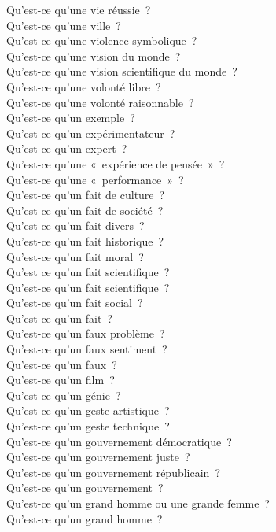 \documentclass[a4paper,12pt]{article}
\begin{document}
Qu'est-ce qu'une vie réussie ? \\
Qu'est-ce qu'une ville ? \\
Qu'est-ce qu'une violence symbolique ? \\
Qu'est-ce qu'une vision du monde ? \\
Qu'est-ce qu'une vision scientifique du monde ? \\
Qu'est-ce qu'une volonté libre ? \\
Qu'est-ce qu'une volonté raisonnable ? \\
Qu'est-ce qu'un exemple ? \\
Qu'est-ce qu'un expérimentateur ? \\
Qu'est-ce qu'un expert ? \\
Qu'est-ce qu'une « expérience de pensée » ? \\
Qu'est-ce qu'une « performance » ? \\
Qu'est-ce qu'un fait de culture ? \\
Qu'est-ce qu'un fait de société ? \\
Qu'est-ce qu'un fait divers ? \\
Qu'est-ce qu'un fait historique ? \\
Qu'est-ce qu'un fait moral ? \\
Qu'est ce qu'un fait scientifique ? \\
Qu'est-ce qu'un fait scientifique ? \\
Qu'est-ce qu'un fait social ? \\
Qu'est-ce qu'un fait ? \\
Qu'est-ce qu'un faux problème ? \\
Qu'est-ce qu'un faux sentiment ? \\
Qu'est-ce qu'un faux ? \\
Qu'est-ce qu'un film ? \\
Qu'est-ce qu'un génie ? \\
Qu'est-ce qu'un geste artistique ? \\
Qu'est-ce qu'un geste technique ? \\
Qu'est-ce qu'un gouvernement démocratique ? \\
Qu'est-ce qu'un gouvernement juste ? \\
Qu'est-ce qu'un gouvernement républicain ? \\
Qu'est-ce qu'un gouvernement ? \\
Qu'est-ce qu'un grand homme ou une grande femme ? \\
Qu'est-ce qu'un grand homme ? \\
\end{document}
